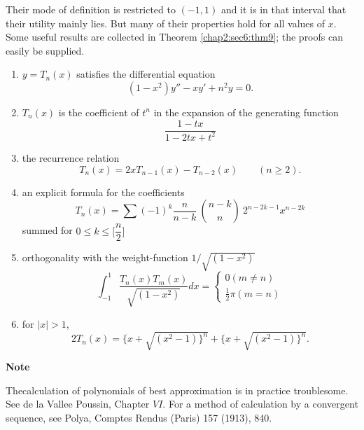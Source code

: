 Their mode of definition is restricted to $(-1,1)$ and it is in that
interval that their utility mainly lies. But many of their properties
hold for all values of $x$. Some useful results are collected in
Theorem \ref{chap2:sec6:thm9}; the proofs can easily be supplied. 
\begin{theorem}\label{chap2:sec6:thm9} %
  \begin{enumerate}[(1)]
  \item $y=T_n(x)$ satisfies the differential equation
    $$
    (1-x^2)y''-xy' +n^2y=0.
    $$
  \item $T_n(x)$ is the coefficient of $t^n$ in the expansion of
    the generating function 
    $$
    \frac{1-tx}{1-2tx+t^2}
    $$
  \item the recurrence relation
    $$
    T_n(x)=2xT_{n-1}(x)-T_{n-2}(x)\qquad (n \geq 2).
    $$
  \item an explicit formula for the coefficients
    $$
    T_n(x)=\sum (-1)^k \frac{n}{n-k} ~\binom{n-k}{n}~ 2^{n-2k-1} x^{n-2k}
    $$
    summed for $0 \leq k \leq \bigg [ \dfrac{n}{2} \bigg ]$
  \item orthogonality with the weight-function $1/ \sqrt{(1-x^2)}$
    $$
    \int^1_{-1} \frac{T_n (x)T_m(x)}{\sqrt{(1-x^2)}} dx= \begin{cases}0
      (m\neq n)\\ \frac{1}{2}\pi (m=n) \end{cases} 
    $$
\item for $|x| > 1$,
  $$
  2T_n(x)=\{x+ \sqrt{(x^2-1)\}^n} +\{x+ \sqrt{(x^2-1)\}^n}.
  $$
  \end{enumerate}
\end{theorem}

\medskip
\begin{center}
\large{\bf Note}
\end{center}

The\pageoriginale calculation of polynomials of best approximation is in practice
troublesome. See de la Vallee Poussin, Chapter $VI$. For a method of
calculation by a convergent sequence, see Polya, Comptes Rendus
(Paris) 157 (1913), 840. 
